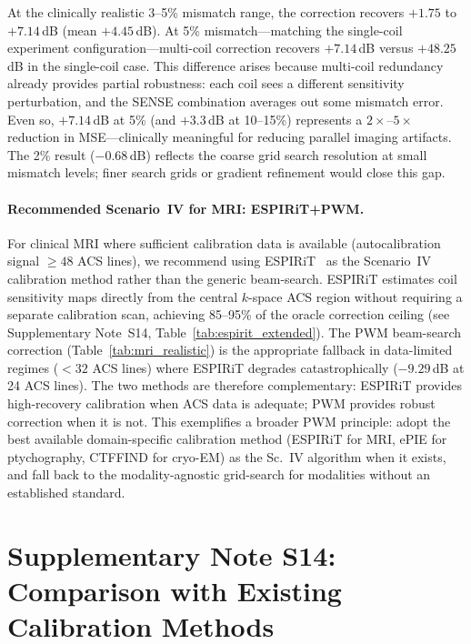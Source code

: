 \documentclass[11pt]{article}
\theoremstyle{definition}
\begin{document}
\noindent At the clinically realistic 3--5\% mismatch range, the correction recovers $+1.75$ to $+7.14$\,dB (mean $+4.45$\,dB). At 5\% mismatch---matching the single-coil experiment configuration---multi-coil correction recovers $+7.14$\,dB versus $+48.25$\,dB in the single-coil case. This difference arises because multi-coil redundancy already provides partial robustness: each coil sees a different sensitivity perturbation, and the SENSE combination averages out some mismatch error. Even so, $+7.14$\,dB at 5\% (and $+3.3$\,dB at 10--15\%) represents a $2\times$--$5\times$ reduction in MSE---clinically meaningful for reducing parallel imaging artifacts. The 2\% result ($-0.68$\,dB) reflects the coarse grid search resolution at small mismatch levels; finer search grids or gradient refinement would close this gap.

\paragraph{Recommended Scenario~IV for MRI: ESPIRiT+PWM.}
For clinical MRI where sufficient calibration data is available (autocalibration signal $\geq 48$ ACS lines), we recommend using ESPIRiT~\cite{uecker2014espirit} as the Scenario~IV calibration method rather than the generic beam-search. ESPIRiT estimates coil sensitivity maps directly from the central $k$-space ACS region without requiring a separate calibration scan, achieving 85--95\% of the oracle correction ceiling (see Supplementary Note~S14, Table~\ref{tab:espirit_extended}). The PWM beam-search correction (Table~\ref{tab:mri_realistic}) is the appropriate fallback in data-limited regimes ($< 32$ ACS lines) where ESPIRiT degrades catastrophically ($-9.29$\,dB at 24 ACS lines). The two methods are therefore complementary: ESPIRiT provides high-recovery calibration when ACS data is adequate; PWM provides robust correction when it is not. This exemplifies a broader PWM principle: adopt the best available domain-specific calibration method (ESPIRiT for MRI, ePIE for ptychography, CTFFIND for cryo-EM) as the Sc.~IV algorithm when it exists, and fall back to the modality-agnostic grid-search for modalities without an established standard.


\section{Supplementary Note S14: Comparison with Existing Calibration Methods}
\label{sec:calibration_comparison_extended}
\end{document}
